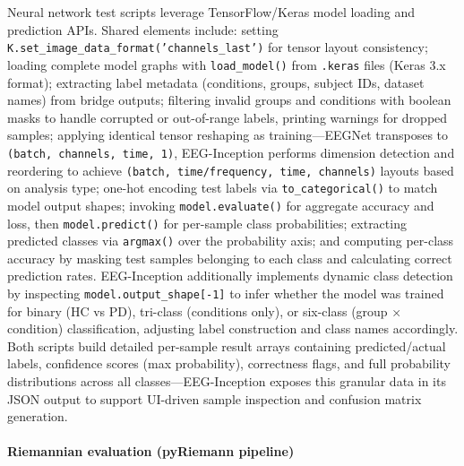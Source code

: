 \documentclass[12pt]{report}
\begin{document}
Neural network test scripts leverage TensorFlow/Keras model loading and prediction APIs. Shared elements include: setting \texttt{K.set\_image\_data\_format('channels\_last')} for tensor layout consistency; loading complete model graphs with \texttt{load\_model()} from \texttt{.keras} files (Keras 3.x format); extracting label metadata (conditions, groups, subject IDs, dataset names) from bridge outputs; filtering invalid groups and conditions with boolean masks to handle corrupted or out-of-range labels, printing warnings for dropped samples; applying identical tensor reshaping as training—EEGNet transposes to \texttt{(batch, channels, time, 1)}, EEG-Inception performs dimension detection and reordering to achieve \texttt{(batch, time/frequency, time, channels)} layouts based on analysis type; one-hot encoding test labels via \texttt{to\_categorical()} to match model output shapes; invoking \texttt{model.evaluate()} for aggregate accuracy and loss, then \texttt{model.predict()} for per-sample class probabilities; extracting predicted classes via \texttt{argmax()} over the probability axis; and computing per-class accuracy by masking test samples belonging to each class and calculating correct prediction rates. EEG-Inception additionally implements dynamic class detection by inspecting \texttt{model.output\_shape[-1]} to infer whether the model was trained for binary (HC vs PD), tri-class (conditions only), or six-class (group × condition) classification, adjusting label construction and class names accordingly. Both scripts build detailed per-sample result arrays containing predicted/actual labels, confidence scores (max probability), correctness flags, and full probability distributions across all classes—EEG-Inception exposes this granular data in its JSON output to support UI-driven sample inspection and confusion matrix generation.

\paragraph{Riemannian evaluation (pyRiemann pipeline)}\mbox{}
\end{document}
